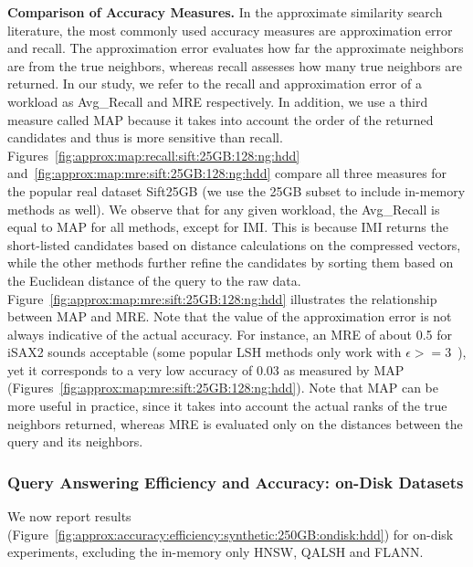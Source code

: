 {{\noindent\textbf{Comparison of Accuracy Measures.} In the approximate similarity search literature, the most commonly used accuracy measures are approximation error and recall. The approximation error evaluates how far the approximate neighbors are from the true neighbors, whereas recall assesses how many true neighbors are returned. 
In our study, we refer to the recall and approximation error of a workload as Avg\_Recall and MRE respectively. 
In addition, we use a third measure called MAP because it takes into account the order of the returned candidates and thus is more sensitive than recall. Figures~\ref{fig:approx:map:recall:sift:25GB:128:ng:hdd} and~\ref{fig:approx:map:mre:sift:25GB:128:ng:hdd} compare all three measures for the popular real dataset Sift25GB (we use the 25GB subset to include in-memory methods as well). 
We observe that for any given workload, the Avg\_Recall is equal to MAP for all methods, except for IMI. 
This is because IMI returns the short-listed candidates based on distance calculations on the compressed vectors, while the other methods further refine the candidates by sorting them based on the Euclidean distance of the query to the raw data. %
Figure~\ref{fig:approx:map:mre:sift:25GB:128:ng:hdd} illustrates the relationship between MAP and MRE. 
Note that the value of the approximation error is not always indicative of the actual accuracy. 
For instance, an MRE of about 0.5 for iSAX2 sounds acceptable (some popular LSH methods only work with $\epsilon>=3$~\cite{journal/tods/tao2010,conf/sigmod/gan2012}), yet it corresponds to a very low accuracy of 0.03 as measured by MAP (Figures~\ref{fig:approx:map:mre:sift:25GB:128:ng:hdd}). 
Note that MAP can be more useful in practice, since it takes into account the actual ranks of the true neighbors returned, whereas MRE is evaluated only on the distances between the query and its neighbors.
















\subsubsection{\textbf{Query Answering Efficiency and Accuracy: on-Disk Datasets}}
\label{ssec:query_efficiency_disk}

{\color{black}We now report results (Figure~\ref{fig:approx:accuracy:efficiency:synthetic:250GB:ondisk:hdd}) for on-disk experiments, excluding the in-memory only HNSW, {QALSH and FLANN}}. %

}}
